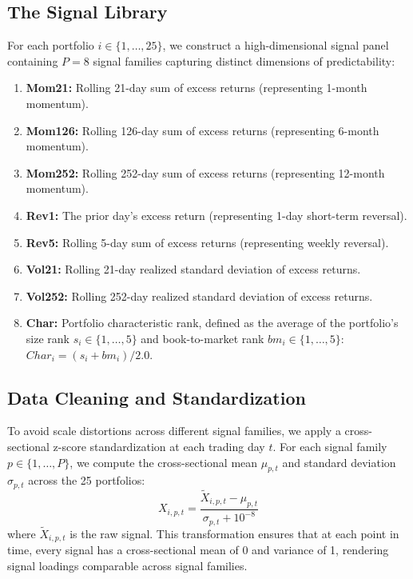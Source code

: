 \documentclass[12pt]{article}
\begin{document}
\subsection{The Signal Library}
For each portfolio $i \in \{1,\dots,25\}$, we construct a high-dimensional signal panel containing $P=8$ signal families capturing distinct dimensions of predictability:
\begin{enumerate}
    \item \textbf{Mom21:} Rolling 21-day sum of excess returns (representing 1-month momentum).
    \item \textbf{Mom126:} Rolling 126-day sum of excess returns (representing 6-month momentum).
    \item \textbf{Mom252:} Rolling 252-day sum of excess returns (representing 12-month momentum).
    \item \textbf{Rev1:} The prior day's excess return (representing 1-day short-term reversal).
    \item \textbf{Rev5:} Rolling 5-day sum of excess returns (representing weekly reversal).
    \item \textbf{Vol21:} Rolling 21-day realized standard deviation of excess returns.
    \item \textbf{Vol252:} Rolling 252-day realized standard deviation of excess returns.
    \item \textbf{Char:} Portfolio characteristic rank, defined as the average of the portfolio's size rank $s_i \in \{1,\dots,5\}$ and book-to-market rank $bm_i \in \{1,\dots,5\}$: $Char_i = (s_i + bm_i) / 2.0$.
\end{enumerate}

\subsection{Data Cleaning and Standardization}
To avoid scale distortions across different signal families, we apply a cross-sectional z-score standardization at each trading day $t$. For each signal family $p \in \{1,\dots,P\}$, we compute the cross-sectional mean $\mu_{p,t}$ and standard deviation $\sigma_{p,t}$ across the 25 portfolios:
\begin{equation}
    X_{i,p,t} = \frac{\widetilde{X}_{i,p,t} - \mu_{p,t}}{\sigma_{p,t} + 10^{-8}}
\end{equation}
where $\widetilde{X}_{i,p,t}$ is the raw signal. This transformation ensures that at each point in time, every signal has a cross-sectional mean of 0 and variance of 1, rendering signal loadings comparable across signal families.
\end{document}
